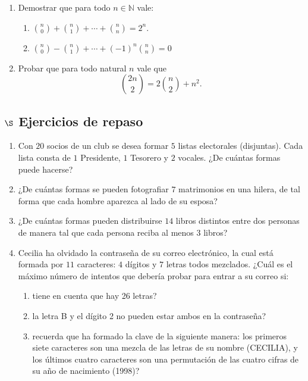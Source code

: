 \documentclass[a4paper,12pt,twoside,spanish,reqno]{amsbook}
\numberwithin{equation}{section}
\begin{document}
\begin {enumerate}
\item Demostrar que para todo $n \in \mathbb N$ vale:
    \begin{enumerate}
        \item $\displaystyle{\binom{n}{0} + \binom{n}{1} + \cdots + \binom{n}{n} = 2^n}$.
        \medskip
        \item $\displaystyle{\binom{n}{0} - \binom{n}{1} + \cdots + (-1)^n\binom{n}{n} = 0}$
    \end{enumerate}


\item Probar que para todo natural $n$ vale que 
    \begin{equation*}
        \binom{2n}{2} = 2 \binom{n}{2} + n^2.
    \end{equation*}

\end{enumerate}



\subsection*{$\S$  Ejercicios de repaso}

\begin{enumerate}[resume]

\item Con $20$ socios de un club se desea formar $5$ listas electorales (disjuntas). Cada lista consta de $1$ Presidente, $1$ Tesorero y $2$ vocales.  ¿De cuántas
formas puede hacerse?


\item ¿De cuántas formas se pueden fotografiar $7$ matrimonios en una hilera, de tal forma que cada hombre aparezca al lado de su esposa?


\item ¿De cuántas formas pueden distribuirse $14$ libros distintos entre dos personas de manera tal que cada persona reciba al menos $3$ libros?

\item Cecilia ha olvidado la contraseña de su correo electrónico, la cual está formada por $11$ caracteres: $4$ dígitos y $7$ letras todos mezclados. ¿Cuál es el máximo número de intentos que debería probar para entrar a su correo si:
    \begin{enumerate}
        \item  tiene en cuenta que hay 26 letras?
        \item la letra B y el dígito 2 no pueden estar ambos en la contraseña?
        \item  recuerda que ha formado la clave de la siguiente manera: los primeros siete caracteres son una mezcla de las letras de su nombre (CECILIA), y los últimos cuatro caracteres son una permutación de las cuatro cifras de su año de nacimiento (1998)?
    \end{enumerate}


\end{enumerate}
\end{document}
